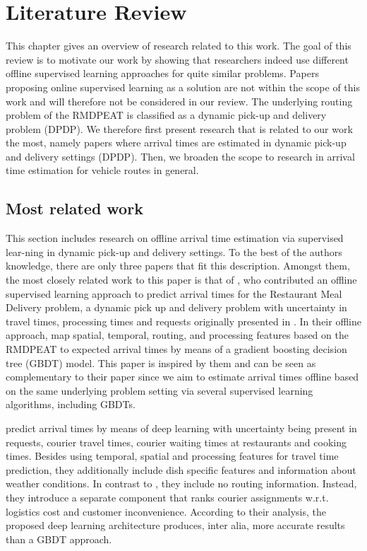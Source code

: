 \chapter{Literature Review}
\label{chap:review}
This chapter gives an overview of research related to this work. The goal of this review is to motivate our work by showing that researchers indeed use different offline supervised learning approaches for quite similar problems. Papers proposing online supervised learning as a solution are not within the scope of this work and will therefore not be considered in our review. The underlying routing problem of the RMDPEAT is classified as a dynamic pick-up and delivery problem (DPDP). We therefore first present research that is related to our work the most, namely papers where arrival times are estimated in dynamic pick-up and delivery settings (DPDP). Then, we broaden the scope to research in arrival time estimation for vehicle routes in general.    

\section{Most related work}
\label{sec:msr}
This section includes research on offline arrival time estimation via supervised lear-ning in dynamic pick-up and delivery settings.
To the best of the authors knowledge, there are only three papers that fit this description. Amongst them, the most closely related work to this paper is that of \citet{Hildebrandt2020_EAT}, who contributed an offline supervised learning approach to predict arrival times for the Restaurant Meal Delivery problem, a dynamic pick up and delivery problem with uncertainty in travel times, processing times and requests originally presented in \citet{UlmerRMDP}.
In their offline approach, \citet{Hildebrandt2020_EAT} map spatial, temporal, routing, and processing features based on the RMDPEAT to expected arrival times by means of a gradient boosting decision tree (GBDT) model. This paper is inspired by them and can be seen as complementary to their paper since we aim to estimate arrival times offline based on the same underlying problem setting via several supervised learning algorithms, including GBDTs.

\citet{Zhu2020_OFCTE_DL} predict arrival times by means of deep learning with uncertainty being present in requests, courier travel times, courier waiting times at restaurants and cooking times. Besides using temporal, spatial and processing features for travel time prediction, they additionally include dish specific features and information about weather conditions. In contrast to \citet{Hildebrandt2020_EAT}, they include no routing information. Instead, they introduce a separate component that ranks courier assignments w.r.t. logistics cost and customer inconvenience. According to their analysis, the proposed deep learning architecture produces, inter alia, more accurate results than a GBDT approach.

